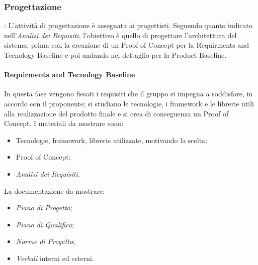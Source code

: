 \subsubsection{Progettazione}: 
L’attività di progettazione è assegnata ai progettisti. Seguendo quanto indicato 
nell’\textit{Analisi dei Requisiti}, l’obiettivo è quello di progettare l’architettura del sistema, 
prima con la creazione di un Proof of Concept per la Requirments and Tecnology Baseline e poi andando 
nel dettaglio per la Product Baseline.

\paragraph{Requirments and Tecnology Baseline} 
In questa fase vengono fissati i requisiti che il gruppo si impegna a soddisfare, in accordo con il 
proponente; si studiano le tecnologie, i framework e le librerie utili alla realizzazione del 
prodotto finale e si crea di conseguenza un Proof of Concept. I materiali da mostrare sono:
    \begin{itemize}
        \item Tecnologie, framework, librerie utilizzate, motivando la scelta;
        \item Proof of Concept;
        \item \textit{Analisi dei Requisiti}.
    \end{itemize}
La documentazione da mostrare:
    \begin{itemize}
        \item \textit{Piano di Progetto};
        \item \textit{Piano di Qualifica};
        \item \textit{Norme di Progetto};
        \item \textit{Verbali} interni ed esterni.
    \end{itemize}